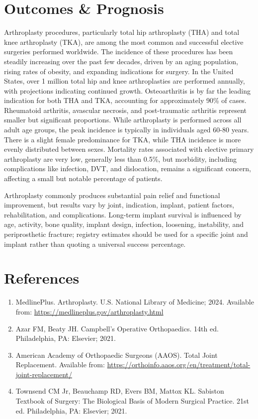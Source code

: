 \section*{Outcomes \& Prognosis}
Arthroplasty procedures, particularly total hip arthroplasty (THA) and total knee arthroplasty (TKA), are among the most common and successful elective surgeries performed worldwide. The incidence of these procedures has been steadily increasing over the past few decades, driven by an aging population, rising rates of obesity, and expanding indications for surgery. In the United States, over 1 million total hip and knee arthroplasties are performed annually, with projections indicating continued growth. Osteoarthritis is by far the leading indication for both THA and TKA, accounting for approximately 90\% of cases. Rheumatoid arthritis, avascular necrosis, and post-traumatic arthritis represent smaller but significant proportions. While arthroplasty is performed across all adult age groups, the peak incidence is typically in individuals aged 60-80 years. There is a slight female predominance for TKA, while THA incidence is more evenly distributed between sexes. Mortality rates associated with elective primary arthroplasty are very low, generally less than 0.5\%, but morbidity, including complications like infection, DVT, and dislocation, remains a significant concern, affecting a small but notable percentage of patients.

Arthroplasty commonly produces substantial pain relief and functional improvement, but results vary by joint, indication, implant, patient factors, rehabilitation, and complications. Long-term implant survival is influenced by age, activity, bone quality, implant design, infection, loosening, instability, and periprosthetic fracture; registry estimates should be used for a specific joint and implant rather than quoting a universal success percentage.

\section*{References}
\begin{enumerate}
  \item MedlinePlus. Arthroplasty. U.S. National Library of Medicine; 2024. Available from: \url{https://medlineplus.gov/arthroplasty.html}
  \item Azar FM, Beaty JH. Campbell's Operative Orthopaedics. 14th ed. Philadelphia, PA: Elsevier; 2021.
  \item American Academy of Orthopaedic Surgeons (AAOS). Total Joint Replacement. Available from: \url{https://orthoinfo.aaos.org/en/treatment/total-joint-replacement/}
  \item Townsend CM Jr, Beauchamp RD, Evers BM, Mattox KL. Sabiston Textbook of Surgery: The Biological Basis of Modern Surgical Practice. 21st ed. Philadelphia, PA: Elsevier; 2021.
\end{enumerate}

\clearpage
